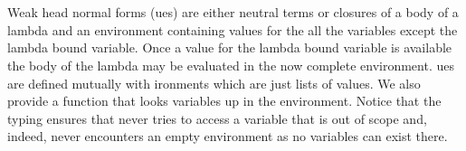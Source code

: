 \documentclass[preliminary,copyright,creativecommons]{eptcs}
\newenvironment{code}{\verbatim}{\endverbatim}
\begin{document}
\begin{code}\>  \AgdaSymbol{(} \AgdaSymbol{:}     \AgdaSymbol{)(} \AgdaSymbol{:} \AgdaSymbol{)} \AgdaSymbol{:}    \<\\
\>[0]\<[2]\>[2] \<[7]\>[7]\AgdaSymbol{:} \AgdaSymbol{\}} \<[17]\>[17]    \<[43]\>[43]    \<\\
\>[0]\<[2]\>[2] \<[7]\>[7]\AgdaSymbol{:}  \AgdaSymbol{\}} \<[17]\>[17]    \AgdaSymbol{(}  \AgdaSymbol{)}     \<[43]\>[43]    \<\end{code}

\noindent
Weak head normal forms (ues) are either neutral terms or
closures of a body of a lambda and an environment containing values
for the all the variables except the lambda bound variable. Once a
value for the lambda bound variable is available the body of the
lambda may be evaluated in the now complete environment. ues
are defined mutually with ironments which are just lists of
values. We also provide a  function that looks
variables up in the environment. Notice that the typing ensures that
 never tries to access a variable that is out of scope
and, indeed, never encounters an empty environment as no variables can
exist there.
\end{document}

